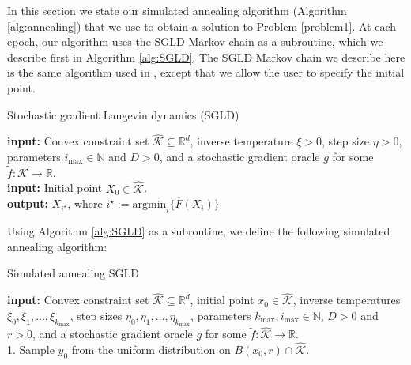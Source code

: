 \documentclass[final,12pt]{colt2018} %
\begin{document}
{In this section we state our simulated annealing algorithm (Algorithm \ref{alg:annealing}) that we use to obtain a solution to Problem \ref{problem1}.  
%
At each epoch, our algorithm uses the SGLD Markov chain as a subroutine, which we describe first in Algorithm \ref{alg:SGLD}.  
%
The SGLD Markov chain we describe here is the same algorithm used in \cite{hitting_times}, except that we allow the user to specify the initial point.
%
\begin{algorithm}[H]
%
\caption{Stochastic gradient Langevin dynamics (SGLD) \label{alg:SGLD}} 
\flushleft
%
\textbf{input:} Convex constraint set $\hat{\mathcal{K}} \subseteq \mathbb{R}^d$,  inverse temperature $\xi>0$, step size $\eta > 0$, parameters $i_{\max} \in \mathbb{N}$ and $D>0$, and a stochastic gradient oracle $g$ for some $\tilde{f}:{{\mathcal{K}}} \rightarrow \mathbb{R}$. \\
%
 \textbf{input:}   Initial point $X_0 \in \hat{\mathcal{K}}$.\\
%
%
%
\textbf{output:} $X_{i^\star}$, where $i^\star := \mathrm{argmin}_i \{\hat{F}(X_i)\}$
\end{algorithm}

\noindent
Using Algorithm \ref{alg:SGLD} as a subroutine, we define the following simulated annealing algorithm:

\begin{algorithm}[H]
%
\caption{Simulated annealing SGLD \label{alg:annealing}} 
\flushleft
%
\textbf{input:} Convex constraint set $\hat{\mathcal{K}} \subseteq \mathbb{R}^d$, initial point $x_0 \in \hat{\mathcal{K}}$,  inverse temperatures $\xi_0,\xi_1,\ldots, \xi_{k_{\mathrm{max}}}$, step sizes $\eta_0, \eta_1,\ldots, \eta_{k_{\mathrm{max}}}$, parameters $k_{\max}, i_{\max} \in \mathbb{N}$, $D>0$ and $r>0$, and a stochastic gradient oracle $g$ for some  $\tilde{f}:\hat{\mathcal{K}} \rightarrow \mathbb{R}$. \\
%
%
1. Sample $y_0$ from the uniform distribution on $B(x_0,r)\cap \hat{\mathcal{K}}$.
%


\end{algorithm}}
\end{document}
